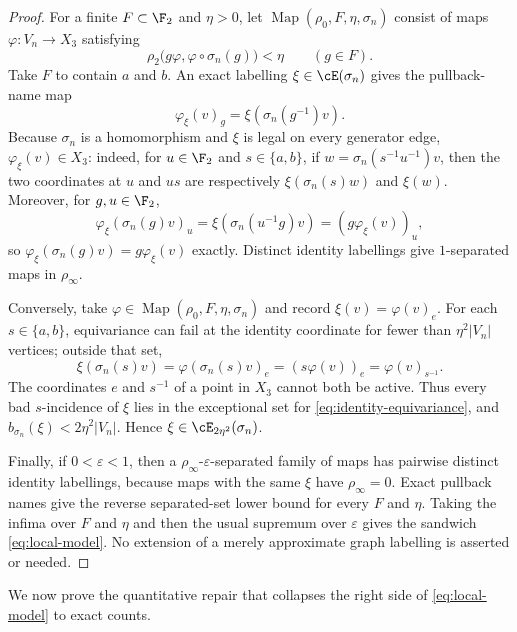 \begin{proof}
For a finite $F\subset\F_2$ and $\eta>0$, let
$\operatorname{Map}(\rho_0,F,\eta,\sigma_n)$ consist of maps
$\varphi:V_n\to X_3$ satisfying
\[
 \rho_2\bigl(g\varphi,\varphi\circ\sigma_n(g)\bigr)<\eta
 \qquad(g\in F).
\]
Take $F$ to contain $a$ and $b$.  An exact labelling
$\xi\in\cE(\sigma_n)$ gives the pullback-name map
\begin{equation}\label{eq:pullback}
 \varphi_\xi(v)_g=\xi(\sigma_n(g^{-1})v).
\end{equation}
Because $\sigma_n$ is a homomorphism and $\xi$ is legal on every generator
edge, $\varphi_\xi(v)\in X_3$: indeed, for $u\in\F_2$ and
$s\in\{a,b\}$, if $w=\sigma_n(s^{-1}u^{-1})v$, then the two coordinates at
$u$ and $us$ are respectively $\xi(\sigma_n(s)w)$ and $\xi(w)$.  Moreover,
for $g,u\in\F_2$,
\[
 \varphi_\xi(\sigma_n(g)v)_u
 =\xi(\sigma_n(u^{-1}g)v)
 =(g\varphi_\xi(v))_u,
\]
so $\varphi_\xi(\sigma_n(g)v)=g\varphi_\xi(v)$ exactly.  Distinct identity
labellings give $1$-separated maps in $\rho_\infty$.

Conversely, take
$\varphi\in\operatorname{Map}(\rho_0,F,\eta,\sigma_n)$ and record
$\xi(v)=\varphi(v)_e$.  For each $s\in\{a,b\}$, equivariance can fail at the
identity coordinate for fewer than $\eta^2|V_n|$ vertices; outside that set,
\begin{equation}\label{eq:identity-equivariance}
 \xi(\sigma_n(s)v)
 =\varphi(\sigma_n(s)v)_e
 =(s\varphi(v))_e
 =\varphi(v)_{s^{-1}}.
\end{equation}
The coordinates $e$ and $s^{-1}$ of a point in $X_3$ cannot both be active.
Thus every bad $s$-incidence of $\xi$ lies in the exceptional set for
\eqref{eq:identity-equivariance}, and
$b_{\sigma_n}(\xi)<2\eta^2|V_n|$.  Hence
$\xi\in\cE_{2\eta^2}(\sigma_n)$.

Finally, if $0<\varepsilon<1$, then a
$\rho_\infty$-$\varepsilon$-separated family of maps has pairwise distinct
identity labellings, because maps with the same $\xi$ have
$\rho_\infty=0$.  Exact pullback names give the reverse separated-set lower
bound for every $F$ and $\eta$.  Taking the infima over $F$ and $\eta$ and
then the usual supremum over $\varepsilon$ gives the sandwich
\eqref{eq:local-model}.  No extension of a merely approximate graph
labelling is asserted or needed.
\end{proof}

We now prove the quantitative repair that collapses the right side of
\eqref{eq:local-model} to exact counts.

